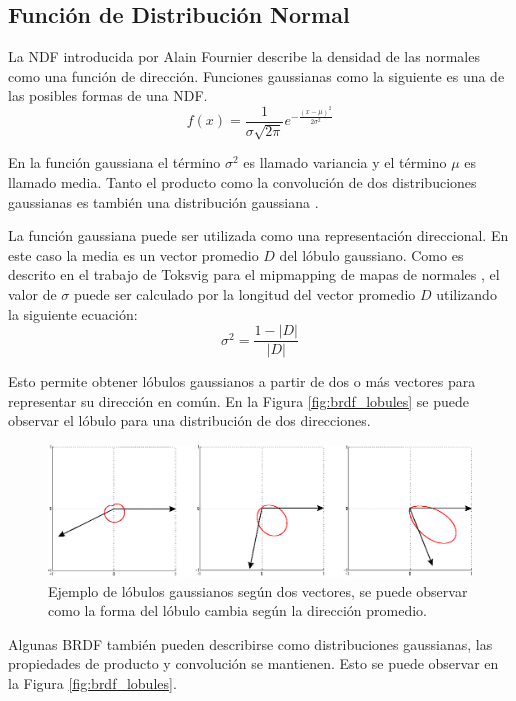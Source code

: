 \subsection{Función de Distribución Normal}
La \ac{NDF} introducida por Alain Fournier \cite{fournier1992d} describe la densidad de las normales como una función de dirección. Funciones gaussianas como la siguiente es una de las posibles formas de una \ac{NDF}.
\begin{equation}
    f(x) = \frac{1}{\sigma\sqrt{2\pi}}e^{-\frac{(x-\mu)^2}{2\sigma^2}}
    \label{eq:ndf_ex1}
\end{equation}

En la función gaussiana el término $\sigma^2$ es llamado variancia y el término $\mu$ es llamado media. Tanto el producto como la convolución de dos distribuciones gaussianas es también una distribución gaussiana \cite{tina-2003}.

La función gaussiana puede ser utilizada como una representación direccional. En este caso la media es un vector promedio $D$ del lóbulo gaussiano. Como es descrito en el trabajo de Toksvig para el mipmapping de mapas de normales \cite{Toksvig05}, el valor de $\sigma$ puede ser calculado por la longitud del vector promedio $D$ utilizando la siguiente ecuación:
\begin{equation}
    \sigma^2 = \frac{1-|D|}{|D|}
    \label{eq:gaussia_eq}
\end{equation}

Esto permite obtener lóbulos gaussianos a partir de dos o más vectores para representar su dirección en común. En la Figura \ref{fig:brdf_lobules} se puede observar el lóbulo para una distribución de dos direcciones.

\begin{figure}[H]
	\centering
	\includegraphics[width=0.85\linewidth]{media/lobes.eps}
	\caption{Ejemplo de lóbulos gaussianos según dos vectores, se puede observar como la forma del lóbulo cambia según la dirección promedio.}
	\label{fig:lobes_example}
\end{figure}

Algunas \ac{BRDF} también pueden describirse como distribuciones gaussianas, las propiedades de producto y convolución se mantienen. Esto se puede observar en la Figura \ref{fig:brdf_lobules}.

